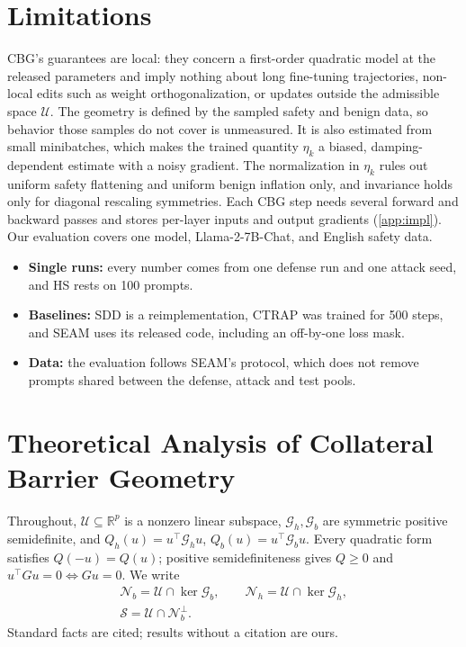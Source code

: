 \documentclass[11pt]{article}
\newcommand{\R}{\mathbb{R}}
\newcommand{\Gh}{\mathcal{G}_{h}}
\newcommand{\Gb}{\mathcal{G}_{b}}
\newcommand{\U}{\mathcal{U}}
\newcommand{\etak}{\eta_{k}}
\newcommand{\Nb}{\mathcal{N}_{b}}
\newcommand{\Nh}{\mathcal{N}_{h}}
\begin{document}
\section*{Limitations}

CBG's guarantees are local: they concern a first-order quadratic model at the released parameters and imply nothing about long fine-tuning trajectories, non-local edits such as weight orthogonalization, or updates outside the admissible space $\U$. The geometry is defined by the sampled safety and benign data, so behavior those samples do not cover is unmeasured. It is also estimated from small minibatches, which makes the trained quantity $\etak$ a biased, damping-dependent estimate with a noisy gradient. The normalization in $\etak$ rules out uniform safety flattening and uniform benign inflation only, and invariance holds only for diagonal rescaling symmetries. Each CBG step needs several forward and backward passes and stores per-layer inputs and output gradients (\cref{app:impl}). Our evaluation covers one model, Llama-2-7B-Chat, and English safety data.
\begin{itemize}
  \item \textbf{Single runs:} every number comes from one defense run and one attack seed, and HS rests on 100 prompts.
  \item \textbf{Baselines:} SDD is a reimplementation, CTRAP was trained for 500 steps, and SEAM uses its released code, including an off-by-one loss mask.
  \item \textbf{Data:} the evaluation follows SEAM's protocol, which does not remove prompts shared between the defense, attack and test pools.
\end{itemize}




\appendix

\section{Theoretical Analysis of Collateral Barrier Geometry}
\label{app:cbg_theory}

Throughout, $\U\subseteq\R^p$ is a nonzero linear subspace, $\Gh,\Gb$ are symmetric positive semidefinite, and $Q_h(u)=u^\top\Gh u$, $Q_b(u)=u^\top\Gb u$. Every quadratic form satisfies $Q(-u)=Q(u)$; positive semidefiniteness gives $Q\ge0$ and $u^\top Gu=0\Leftrightarrow Gu=0$. We write
\begin{equation*}
\begin{gathered}
\Nb=\U\cap\ker\Gb,\qquad \Nh=\U\cap\ker\Gh,\\
\mathcal S=\U\cap\Nb^\perp .
\end{gathered}
\end{equation*}
Standard facts are cited; results without a citation are ours.
\end{document}
